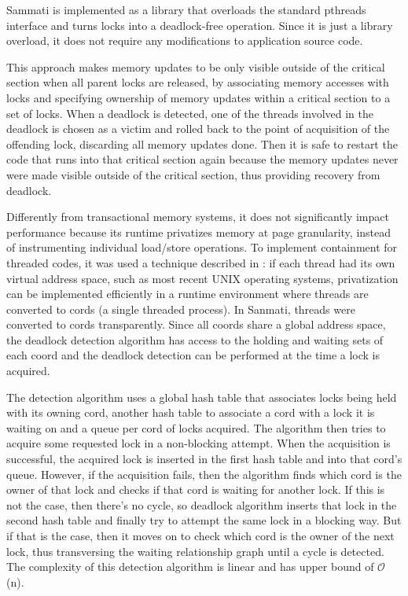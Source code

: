 Sammati is implemented as a library that overloads the standard pthreads interface and turns locks into a deadlock-free operation. Since it is just a library overload,
it does not require any modifications to application source code.

This approach makes memory updates to be only visible outside of the critical section when all parent locks are released, by associating memory accesses
with locks and specifying ownership of memory updates within a critical section to a set of locks. When a deadlock is detected, one of the threads involved in the deadlock is
chosen as a victim and rolled back to the point of acquisition of the offending lock, discarding all memory updates done.
Then it is safe to restart the code that runs into that critical section again because the memory updates never were made visible outside of the critical
section, thus providing recovery from deadlock.

Differently from transactional memory systems, it does not significantly impact performance because its runtime privatizes memory at page granularity, instead of instrumenting
individual load/store operations. To implement containment for threaded codes, it was used a technique described in \cite{berger}: if each thread had its own virtual address space,
such as most recent UNIX operating systems, privatization can be implemented efficiently in a runtime environment where threads are converted to cords (a single threaded process).
In Sanmati, threads were converted to cords transparently. Since all coords share a global address space, the deadlock detection algorithm has access to the holding and waiting
sets of each coord and the deadlock detection can be performed at the time a lock is acquired.

The detection algorithm uses a global hash table that associates locks being held with its owning cord, another hash table to associate a cord with a lock it is waiting on and a
queue per cord of locks acquired. The algorithm then tries to acquire some requested lock in a non-blocking attempt. When the acquisition is successful, the acquired lock is
inserted in the first hash table and into that cord's queue. However, if the acquisition fails, then the algorithm finds which cord is the owner of that lock and checks if that
cord is waiting for another lock. If this is not the case, then there's no cycle, so deadlock algorithm inserts that lock in the second hash table and finally try to attempt
the same lock in a blocking way. But if that is the case, then it moves on to check which cord is the owner of the next lock, thus transversing the waiting relationship graph
until a cycle is detected. The complexity of this detection algorithm is linear and has upper bound of $\mathcal{O}$(n).

